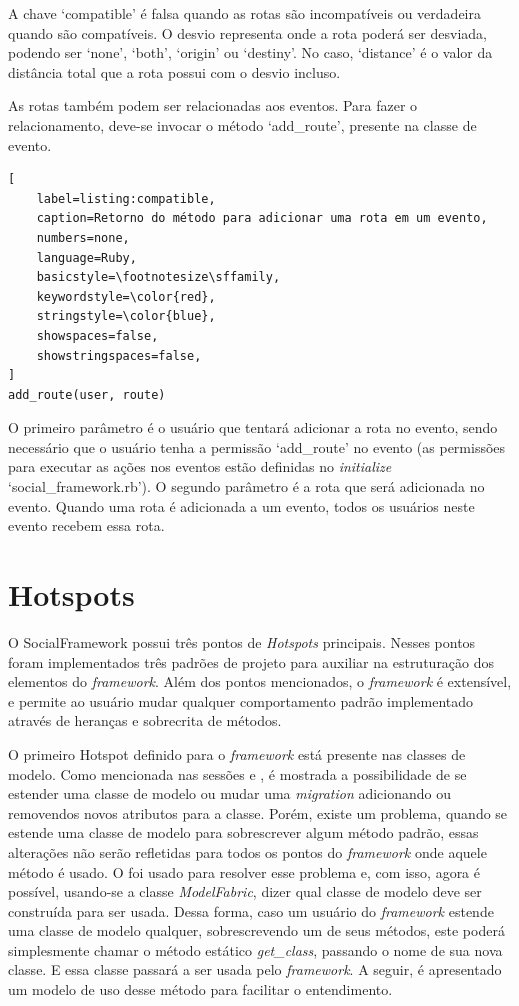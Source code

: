 A chave `compatible' é falsa quando as rotas são incompatíveis ou verdadeira quando são compatíveis. O desvio representa onde a rota poderá ser desviada, podendo ser `none', `both', `origin' ou `destiny'. No caso, `distance' é o valor da distância total que a rota possui com o desvio incluso.

As rotas também podem ser relacionadas aos eventos. Para fazer o relacionamento, deve-se invocar o método `add\_route', presente na classe de evento.

\begin{lstlisting}[
    label=listing:compatible,
    caption=Retorno do método para adicionar uma rota em um evento,
    numbers=none,
    language=Ruby,
    basicstyle=\footnotesize\sffamily,
    keywordstyle=\color{red},
    stringstyle=\color{blue},
    showspaces=false,
    showstringspaces=false,
]
add_route(user, route)
\end{lstlisting}

O primeiro parâmetro é o usuário que tentará adicionar a rota no evento, sendo necessário que o usuário tenha a permissão `add\_route' no evento (as permissões para executar as ações nos eventos estão definidas no \textit{initialize} `social\_framework.rb'). O segundo parâmetro é a rota que será adicionada no evento. Quando uma rota é adicionada a um evento, todos os usuários neste evento recebem essa rota.

\section{Hotspots}
\label{sec:hotspots}

O SocialFramework possui três pontos de \textit{Hotspots} principais. Nesses pontos foram implementados três padrões de projeto para auxiliar na estruturação dos elementos do \textit{framework}. Além dos pontos mencionados, o \textit{framework} é extensível, e permite ao usuário mudar qualquer comportamento padrão implementado através de heranças e sobrecrita de métodos.

O primeiro Hotspot definido para o \textit{framework} está presente nas classes de modelo. Como mencionada nas sessões  e , é mostrada a possibilidade de se estender uma classe de modelo ou mudar uma \textit{migration} adicionando ou removendos novos atributos para a classe. Porém, existe um problema, quando se estende uma classe de modelo para sobrescrever algum método padrão, essas alterações não serão refletidas para todos os pontos do \textit{framework} onde aquele método é usado. O  foi usado para resolver esse problema e, com isso, agora é possível, usando-se a classe \textit{ModelFabric}, dizer qual classe de modelo deve ser construída para ser usada. Dessa forma, caso um usuário do \textit{framework} estende uma classe de modelo qualquer, sobrescrevendo um de seus métodos, este poderá simplesmente chamar o método estático \textit{get\_class}, passando o nome de sua nova classe. E essa classe passará a ser usada pelo \textit{framework}. A seguir, é apresentado um modelo de uso desse método para facilitar o entendimento.

